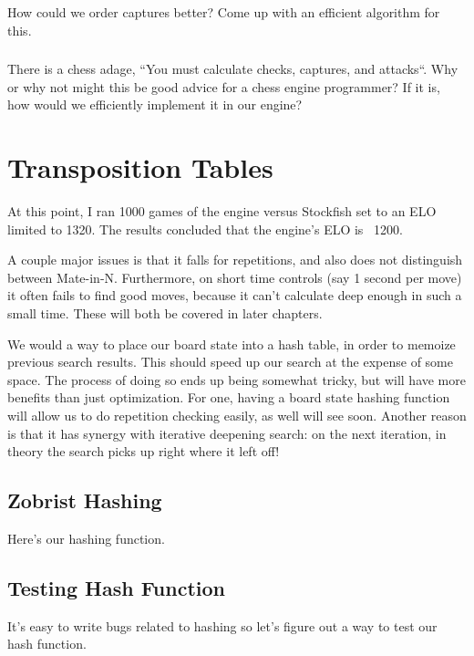 \documentclass[letterpaper,11pt]{article}
\begin{document}
How could we order captures better? Come up with an efficient algorithm for this.

\subsubsection{}

There is a chess adage, ``You must calculate checks, captures, and attacks``. 
Why or why not might this be good advice for a chess engine programmer? If it is, how would 
we efficiently implement it in our engine?

\section{Transposition Tables}

At this point, I ran 1000 games of the engine versus Stockfish set to an ELO limited to 1320. The results concluded that the engine's ELO is ~1200.

A couple major issues is that it falls for repetitions, and also does not distinguish between Mate-in-N. Furthermore, on short time controls (say 1 second per move) it often fails to find good moves, because it can't calculate deep enough in such a small time. These will both be covered in later chapters.

We would a way to place our board state into a hash table, in order to memoize previous search results. This should speed up our search at the expense of some space.
The process of doing so ends up being somewhat tricky, but will have more benefits than just optimization. For one, having a board state hashing function 
will allow us to do repetition checking easily, as well will see soon. Another reason is that it has synergy with iterative deepening search: on the next iteration, in theory the search picks up right where it left off!

\subsection{Zobrist Hashing}

Here's our hashing function.

\subsection{Testing Hash Function}

It's easy to write bugs related to hashing so let's figure out a way to test our hash function.
\end{document}
